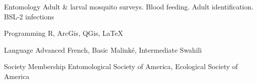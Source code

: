 

\begin{cvskills}

  \cvskill
    {Entomology} %
    {Adult \& larval mosquito surveys.  Blood feeding. Adult identification. BSL-2 infections} %

  \cvskill
    {Programming} %
    {R, ArcGis, QGis, LaTeX} %

  \cvskill
    {Language} %
    {Advanced French, Basic Malink\'e, Intermediate Swahili} %


  \cvskill
    {Society Membership}
    {Entomological Society of America, Ecological Society of America}

\end{cvskills}
